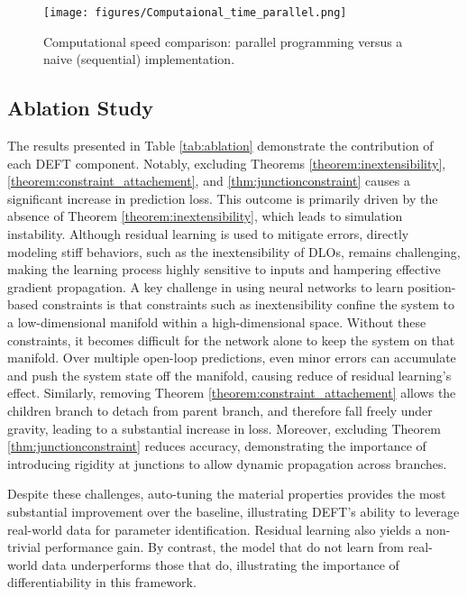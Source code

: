 \begin{figure}[t]
    \centering
    \texttt{[image: figures/Computaional\_time\_parallel.png]}
    \caption{Computational speed comparison: parallel programming versus a naive (sequential) implementation.
    }
    \label{fig:computational speed3}
\end{figure}

\subsection{Ablation Study}
The results presented in Table \ref{tab:ablation} demonstrate the contribution of each DEFT component. 
Notably, excluding Theorems \ref{theorem:inextensibility}, \ref{theorem:constraint_attachement}, and \ref{thm:junctionconstraint} causes a significant increase in prediction loss. 
This outcome is primarily driven by the absence of Theorem \ref{theorem:inextensibility}, which leads to simulation instability. 
Although residual learning is used to mitigate errors, directly modeling stiff behaviors, such as the inextensibility of DLOs, remains challenging, making the learning process highly sensitive to inputs and hampering effective gradient propagation.
A key challenge in using neural networks to learn position-based constraints is that constraints such as inextensibility confine the system to a low-dimensional manifold within a high-dimensional space. 
Without these constraints, it becomes difficult for the network alone to keep the system on that manifold.
Over multiple open-loop predictions, even minor errors can accumulate and push the system state off the manifold, causing reduce of residual learning's effect.
Similarly, removing Theorem \ref{theorem:constraint_attachement} allows the children branch to detach from parent branch, and therefore fall freely under gravity, leading to a substantial increase in loss. 
Moreover, excluding Theorem \ref{thm:junctionconstraint} reduces accuracy, demonstrating the importance of introducing rigidity at junctions to allow dynamic propagation across branches.

Despite these challenges, auto-tuning the material properties provides the most substantial improvement over the baseline, illustrating DEFT’s ability to leverage real-world data for parameter identification. 
Residual learning also yields a non-trivial performance gain. 
By contrast, the model that do not learn from real-world data underperforms those that do, illustrating the importance of differentiability in this framework.


